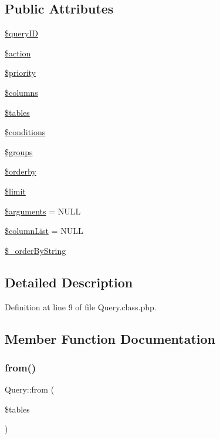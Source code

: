 \subsection*{Public Attributes}
\begin{DoxyCompactItemize}
\item 
\hyperlink{classQuery_a67666b2fcd6c60e73d8329f7d22044dc}{\$query\+ID}
\item 
\hyperlink{classQuery_a62c36010085369fc0508ea548660be9f}{\$action}
\item 
\hyperlink{classQuery_a4d64f61fd525a70ebc2aaa6ab8291e20}{\$priority}
\item 
\hyperlink{classQuery_a7cf97254cbd55fdbb9e149723498d9ba}{\$columns}
\item 
\hyperlink{classQuery_a5c74163d1615b141456b123c11fa9d92}{\$tables}
\item 
\hyperlink{classQuery_a5c71d786a82b2cc014968d2553b6bc9d}{\$conditions}
\item 
\hyperlink{classQuery_a76992fbfae6d700e65dfde28911a2475}{\$groups}
\item 
\hyperlink{classQuery_aa955216a83dfe57cdd9600b44b38ebac}{\$orderby}
\item 
\hyperlink{classQuery_abe481cf8b7f42b513a4f64cf7fb0ffea}{\$limit}
\item 
\hyperlink{classQuery_a49166e3c5f5198e4b899c8ee47b6258a}{\$arguments} = N\+U\+LL
\item 
\hyperlink{classQuery_a113bcdfdc3bf6acef684a06ae324334a}{\$column\+List} = N\+U\+LL
\item 
\hyperlink{classQuery_aaf035e5cfac7afe46163a6ba4c55c34b}{\$\+\_\+order\+By\+String}
\end{DoxyCompactItemize}


\subsection{Detailed Description}


Definition at line 9 of file Query.\+class.\+php.



\subsection{Member Function Documentation}
\hypertarget{classQuery_a8c48087275e1fb408298c5c6295bbf20}{}\label{classQuery_a8c48087275e1fb408298c5c6295bbf20} 
\subsubsection{\texorpdfstring{from()}{from()}}
{\footnotesize\ttfamily Query\+::from (\begin{DoxyParamCaption}\item[{}]{\$tables }\end{DoxyParamCaption})}

